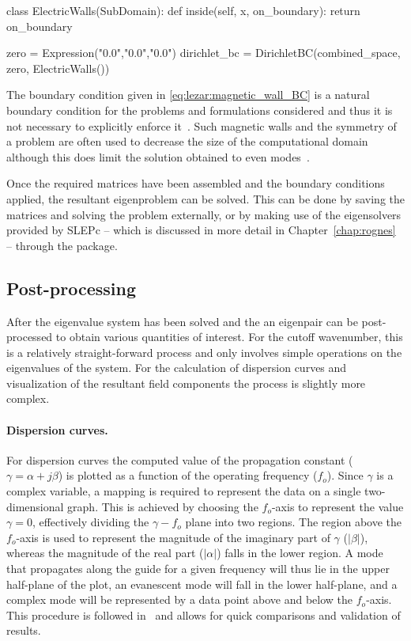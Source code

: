 \begin{python}
class ElectricWalls(SubDomain):
    def inside(self, x, on_boundary):
        return on_boundary

zero = Expression("0.0","0.0","0.0")
dirichlet_bc = DirichletBC(combined_space, zero, ElectricWalls())
\end{python}

The boundary condition given in \eqref{eq:lezar:magnetic_wall_BC}
is a natural boundary condition for the problems and formulations
considered and thus it is not necessary to explicitly enforce
it~\citep{PelosiCoccioliSelleri1998}. Such magnetic walls and the
symmetry of a problem are often used to decrease the size of the
computational domain although this does limit the solution obtained to
even modes~\citep{Jin2002}.

Once the required matrices have been assembled and the boundary conditions
applied, the resultant eigenproblem can be solved. This can be done by
saving the matrices and solving the problem externally, or by making
use of the eigensolvers provided by SLEPc -- which is discussed in more
detail in Chapter~\ref{chap:rognes} -- through the \fenics{} package.

\subsection{Post-processing}

After the eigenvalue system has been solved and the an eigenpair can
be post-processed to obtain various quantities of interest. For the
cutoff wavenumber, this is a relatively
straight-forward process and only involves simple operations on the
eigenvalues of the system. For the calculation of dispersion curves
and visualization of the resultant field components the process is
slightly more complex.

\paragraph{Dispersion curves.}

For dispersion curves the computed value of the propagation constant
($\gamma = \alpha + j\beta$) is plotted as a function of the operating
frequency ($f_o$). Since $\gamma$ is a complex variable, a mapping is
required to represent the data on a single two-dimensional graph. This
is achieved by choosing the $f_o$-axis to represent the value $\gamma
= 0$, effectively dividing the {$\gamma-f_o$} plane into two
regions. The region above the $f_o$-axis is used to represent the
magnitude of the imaginary part of $\gamma$ ($|\beta|$), whereas the
magnitude of the real part ($|\alpha|$) falls in the lower region. A
mode that propagates along the guide for a given frequency will thus
lie in the upper half-plane of the plot, an evanescent mode will fall
in the lower half-plane, and a complex mode will be represented by a
data point above and below the $f_o$-axis.  This procedure is followed
in~\citet{PelosiCoccioliSelleri1998} and allows for quick comparisons
and validation of results.


